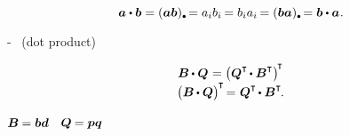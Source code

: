 \nopagebreak\vspace{-0.2em}\begin{equation}
\label{transposeofdotproductforvectors}
\bm{a} \dotp \bm{b}
= ( \bm{a} \bm{b} )\hspace{.1ex}\tracedot \hspace{-0.1ex}
= a_i b_i \hspace{-0.2ex}
= b_i a_i \hspace{-0.2ex}
= ( \bm{b} \bm{a} )\hspace{.1ex}\tracedot \hspace{-0.1ex}
= \bm{b} \dotp \bm{a}
\hspace{.1ex} .
\end{equation}

\hbox{\hspace{-0.2ex}\inquotes{${\dotp\hspace{.22ex}}$}\hspace{-0.2ex}-}~%
(dot product)

\nopagebreak\vspace{-0.2em}
\begin{equation}\label{transposeofdotproductforbivalenttensors}
\begin{array}{c}
\bm{B} \hspace{-0.1ex} \dotp \bm{Q} \hspace{.1ex} = \bigl( \bm{Q}^{\T} \hspace{-0.2ex}\dotp \bm{B}^{\T} \bigr)^{\hspace{-0.25ex}\T}
\\[.1em]
\bigl( \bm{B} \hspace{-0.1ex} \dotp \bm{Q} \bigr)^{\hspace{-0.1ex}\T} \hspace{-0.3ex} = \hspace{.1ex} \bm{Q}^{\T} \hspace{-0.2ex}\dotp \bm{B}^{\T}
\hspace{-0.2ex} .
\end{array}
\end{equation}

{}
${\bm{B} \hspace{-0.1ex} = \bm{b}\bm{d}}$ ~${\bm{Q} \hspace{-0.1ex} = \bm{p}\bm{q}}$

